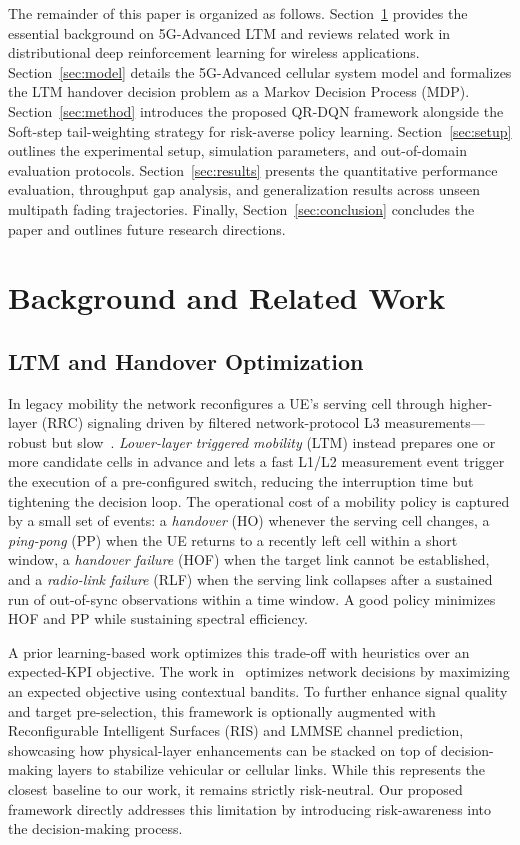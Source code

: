 \documentclass{ieeetmlcn}
\begin{document}
The remainder of this paper is organized as follows. Section~\ref{sec:related} provides the essential background on 5G-Advanced LTM and reviews related work in distributional deep reinforcement learning for wireless applications. Section~\ref{sec:model} details the 5G-Advanced cellular system model and formalizes the LTM handover decision problem as a Markov Decision Process (MDP). Section~\ref{sec:method} introduces the proposed QR-DQN framework alongside the Soft-step tail-weighting strategy for risk-averse policy learning. Section~\ref{sec:setup} outlines the experimental setup, simulation parameters, and out-of-domain evaluation protocols. Section~\ref{sec:results} presents the quantitative performance evaluation, throughput gap analysis, and generalization results across unseen multipath fading trajectories. Finally, Section~\ref{sec:conclusion} concludes the paper and outlines future research directions.


\section{Background and Related Work}
\label{sec:related}

\subsection{LTM and Handover Optimization}
In legacy mobility the network reconfigures a UE's serving cell through
higher-layer (RRC) signaling driven by filtered network-protocol L3 measurements---robust but slow~\cite{eric2024}.
\emph{Lower-layer triggered mobility} (LTM) instead prepares one or more candidate cells in advance and lets a fast L1/L2 measurement event trigger the execution of a pre-configured switch, reducing the interruption time but tightening the decision loop.
The operational cost of a mobility policy is captured by a small set of events: a \emph{handover} (HO) whenever the serving cell changes, a \emph{ping-pong} (PP) when the UE returns to a recently left cell within a short window, a \emph{handover failure} (HOF) when the target
link cannot be established, and a \emph{radio-link failure} (RLF) when the serving link collapses after a sustained run of out-of-sync observations within a time window.
A good policy minimizes HOF and PP while sustaining spectral efficiency.

A prior learning-based work optimizes this trade-off with heuristics over an expected-KPI objective. The work in~\cite{cmab_ho} optimizes network decisions by maximizing an expected objective using contextual bandits. To further enhance signal quality and target pre-selection, this framework is optionally augmented with Reconfigurable Intelligent Surfaces (RIS) and LMMSE channel prediction, showcasing how physical-layer enhancements can be stacked on top of decision-making layers to stabilize vehicular or cellular links. While this represents the closest baseline to our work, it remains strictly risk-neutral. Our proposed framework directly addresses this limitation by introducing risk-awareness into the decision-making process.
\end{document}
